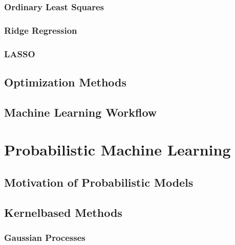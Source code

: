 \documentclass[letterpaper,10pt,english]{jupyterBook}
\begin{document}
\section{Ordinary Least Squares}
\label{\detokenize{fund/linregr:ordinary-least-squares}}

\section{Ridge Regression}
\label{\detokenize{fund/linregr:ridge-regression}}

\section{LASSO}
\label{\detokenize{fund/linregr:lasso}}

\chapter{Optimization Methods}
\label{\detokenize{fund/opt:optimization-methods}}\label{\detokenize{fund/opt::doc}}

\chapter{Machine Learning Workflow}
\label{\detokenize{fund/MLworkflow:machine-learning-workflow}}\label{\detokenize{fund/MLworkflow::doc}}

\part{Probabilistic Machine Learning}


\chapter{Motivation of Probabilistic Models}
\label{\detokenize{probML/motivation:motivation-of-probabilistic-models}}\label{\detokenize{probML/motivation::doc}}

\chapter{Kernel\sphinxhyphen{}based Methods}
\label{\detokenize{probML/kernelmethods:kernel-based-methods}}\label{\detokenize{probML/kernelmethods::doc}}

\section{Gaussian Processes}
\label{\detokenize{probML/kernelmethods:gaussian-processes}}
\end{document}
